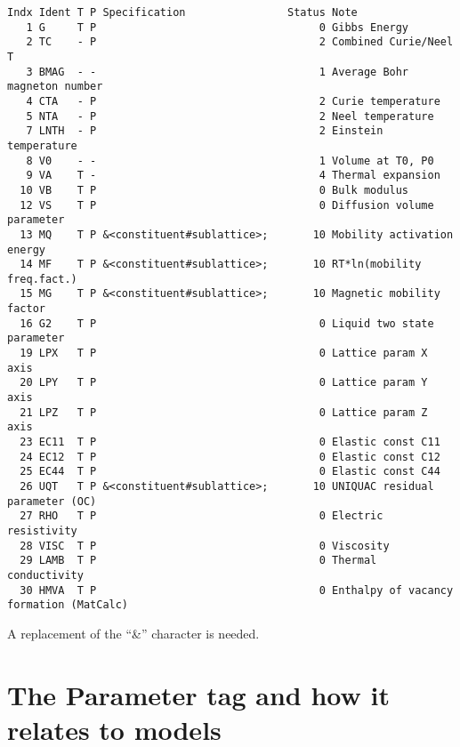 \documentclass{article}
\begin{document}
\begin{appendices}
\begin{table}[!h]
{\small
\begin{verbatim}
Indx Ident T P Specification                Status Note
   1 G     T P                                   0 Gibbs Energy
   2 TC    - P                                   2 Combined Curie/Neel T
   3 BMAG  - -                                   1 Average Bohr magneton number
   4 CTA   - P                                   2 Curie temperature
   5 NTA   - P                                   2 Neel temperature
   7 LNTH  - P                                   2 Einstein temperature
   8 V0    - -                                   1 Volume at T0, P0
   9 VA    T -                                   4 Thermal expansion
  10 VB    T P                                   0 Bulk modulus
  12 VS    T P                                   0 Diffusion volume parameter
  13 MQ    T P &<constituent#sublattice>;       10 Mobility activation energy
  14 MF    T P &<constituent#sublattice>;       10 RT*ln(mobility freq.fact.)
  15 MG    T P &<constituent#sublattice>;       10 Magnetic mobility factor
  16 G2    T P                                   0 Liquid two state parameter
  19 LPX   T P                                   0 Lattice param X axis
  20 LPY   T P                                   0 Lattice param Y axis
  21 LPZ   T P                                   0 Lattice param Z axis
  23 EC11  T P                                   0 Elastic const C11
  24 EC12  T P                                   0 Elastic const C12
  25 EC44  T P                                   0 Elastic const C44
  26 UQT   T P &<constituent#sublattice>;       10 UNIQUAC residual parameter (OC)
  27 RHO   T P                                   0 Electric resistivity
  28 VISC  T P                                   0 Viscosity
  29 LAMB  T P                                   0 Thermal conductivity
  30 HMVA  T P                                   0 Enthalpy of vacancy formation (MatCalc)
\end{verbatim}
  }
\end{table}

A replacement of the ``\&'' character is needed.

\newpage 

\setcounter{equation}{0}
\renewcommand{\theequation}{C\arabic{equation}}
\setcounter{figure}{0}
\renewcommand{\thefigure}{C\arabic{figure}}

\section{The Parameter tag and how it relates to models}\label{sec:partags}


\end{appendices}
\end{document}
